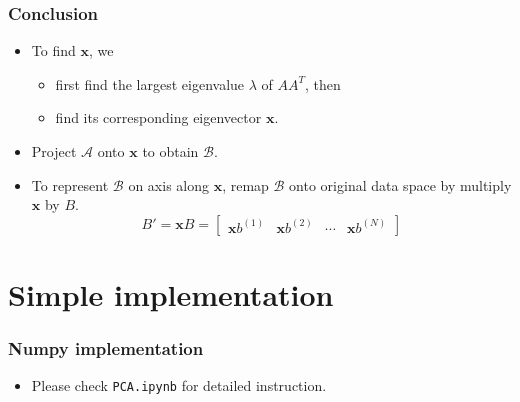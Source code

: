 \documentclass[serif]{beamer}
\begin{document}
\begin{frame}
    \frametitle{Conclusion}
    \begin{itemize}
        \item To find $\mathbf{x}$, we
        \begin{itemize}
            \item first find the largest eigenvalue $\lambda$ of $AA^T$, then
            \item find its corresponding eigenvector $\mathbf{x}$.
        \end{itemize}
        \item Project $\mathcal{A}$ onto $\mathbf{x}$ to obtain $\mathcal{B}$.
        \item To represent $\mathcal{B}$ on axis along $\mathbf{x}$, remap $\mathcal{B}$ onto original data space by multiply $\mathbf{x}$ by $B$.
        $$
        B' = \mathbf{x}B = \begin{bmatrix}
            \mathbf{x}b^{(1)} & \mathbf{x}b^{(2)} & \cdots & \mathbf{x}b^{(N)}
        \end{bmatrix}
        $$
        \begin{center}
        \end{center}
    \end{itemize}
\end{frame}

\section{Simple implementation}

\begin{frame}
    \frametitle{Numpy implementation}
    \begin{itemize}
        \item Please check \texttt{PCA.ipynb} for detailed instruction.
    \end{itemize}
\end{frame}
\end{document}
